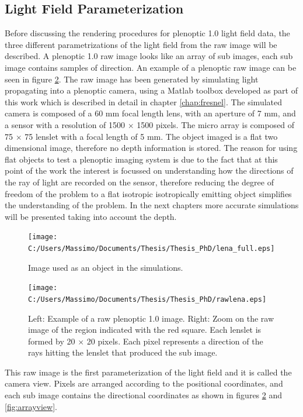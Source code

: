 \subsection{Light Field Parameterization}
\label{sec:LFparam}
Before discussing the rendering procedures for plenoptic 1.0 light field data, the three different parametrizations of the light field from the raw image will be described. A plenoptic 1.0 raw image looks like an array of sub images, each sub image contains samples of direction. An example of a plenoptic raw image can be seen in figure \ref{fig:rawlena10}. The raw image has been generated by simulating light propagating into a plenoptic camera, using a Matlab toolbox developed as part of this work which is described in detail in chapter \ref{chap:fresnel}. The simulated camera is composed of a 60 mm focal length lens, with an aperture of 7 mm, and a sensor with a resolution of 1500 $\times$ 1500 pixels. The micro array is composed of 75 $\times$ 75 lenslet with a focal length of 5 mm. The object imaged is a flat two dimensional image, therefore no depth information is stored. The reason for using flat objects to test a plenoptic imaging system is due to the fact that at this point of the work the interest is focussed on  understanding how the directions of the ray of light are recorded on the sensor, therefore reducing the degree of freedom of the problem to a flat isotropic isotropically emitting object simplifies the understanding of the problem. In the next chapters more accurate simulations will be presented taking into account the depth.
\begin{figure}[H]
	\centering
	\texttt{[image: C:/Users/Massimo/Documents/Thesis/Thesis\_PhD/lena\_full.eps]}
	\caption{\label{fig:lenafull} Image used as an object in the simulations.}
\end{figure}
\begin{figure}[H]
	\centering
	\texttt{[image: C:/Users/Massimo/Documents/Thesis/Thesis\_PhD/rawlena.eps]}
	\caption{\label{fig:rawlena10}Left: Example of a raw plenoptic 1.0 image. Right: Zoom on the raw image of the region indicated with the red square. Each lenslet is formed by 20 $\times$ 20 pixels. Each pixel represents a direction of the rays hitting the lenslet that produced the sub image.  }
\end{figure}
This raw image is the first parameterization of the light field and it is called the camera view. Pixels are arranged according to the positional coordinates, and each sub image contains the directional coordinates as shown in figures \ref{fig:rawlena10} and \ref{fig:arrayview}. \\
